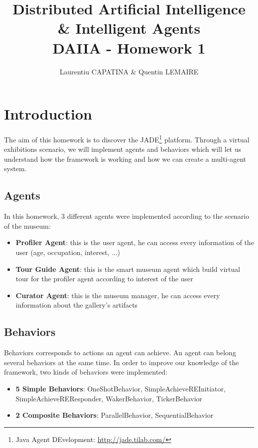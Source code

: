\documentclass[a4paper,11pt]{article}
\title{Distributed Artificial Intelligence \& Intelligent Agents \\ DAIIA - Homework 1}
\author{Laurentiu CAPATINA \& Quentin LEMAIRE}
\begin{document}
  \maketitle %

  \section{Introduction}
  
  The aim of this homework is to discover the JADE\footnote{Java Agent DEvelopment: \href{http://jade.tilab.com/}{http://jade.tilab.com/}} platform. 
  Through a virtual exhibitions scenario, we will implement agents and behaviors which will let us understand how the framework is working 
  and how we can create a multi-agent system.
  
  
  \subsection{Agents}
  
  In this homework, 3 different agents were implemented according to the scenario of the museum:
  \begin{itemize}[label=--]
   \item \textbf{Profiler Agent}: this is the user agent, he can access every information of the user (age, occupation, interest, ...)
   \item \textbf{Tour Guide Agent}: this is the smart museum agent which build virtual tour for the profiler agent according to interest of the user
   \item \textbf{Curator Agent}: this is the museum manager, he can access every information about the gallery's artifacts
  \end{itemize}

  
  \subsection{Behaviors}
  
  Behaviors corresponds to actions an agent can achieve. An agent can belong several behaviors at the same time. In order to improve our knowledge of 
  the framework, two kinds of behaviors were implemented:
  \begin{itemize}[label=--]
   \item \textbf{5 Simple Behaviors}: OneShotBehavior, SimpleAchieveREInitiator, SimpleAchieveREResponder, WakerBehavior, TickerBehavior
   \item \textbf{2 Composite Behaviors}: ParallelBehavior, SequentialBehavior
  \end{itemize}
  
\end{document}
